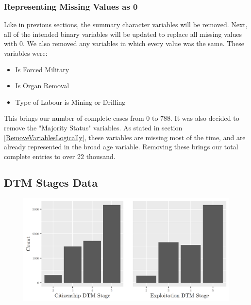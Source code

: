 \documentclass{article} %
\begin{document}
\subsubsection{Representing Missing Values as 0}

Like in previous sections, the summary character variables will be removed. Next, all of the intended binary variables will be updated to replace all missing values with 0. We also removed any variables in which every value was the same. These variables were:

\begin{multicols}{3}
	\begin{itemize}
		\item Is Forced Military
		\item Is Organ Removal
		\item Type of Labour is Mining or Drilling
	\end{itemize}
\end{multicols}

This brings our number of complete cases from 0 to 788. It was also decided to remove the "Majority Status" variables. As stated in section \ref{RemoveVariablesLogically}, these variables are missing most of the time, and are already represented in the broad age variable. Removing these brings our total complete entries to over 22 thousand. 



\subsection{DTM Stages Data}

\FloatBarrier
\begin{figure}[H]
	\includegraphics[width=\textwidth]{DTMStagesBarplot}
\end{figure}
\FloatBarrier
\end{document}
